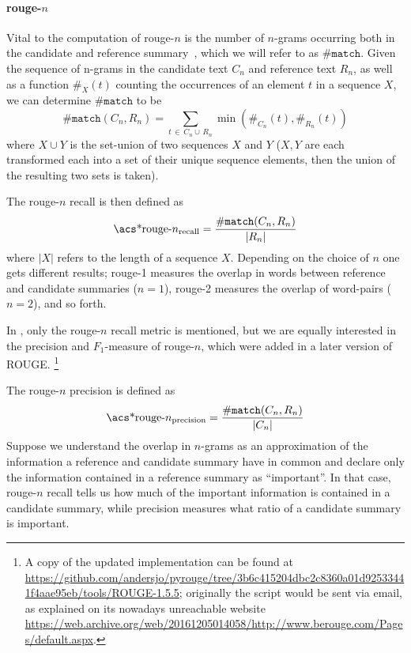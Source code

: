 \paragraph{\acs*{rouge}-\(n\)}
\newcommand{\matchcount}{\ensuremath{\#\texttt{match}}}
Vital to the computation of \acs*{rouge}-\(n\) is the number of \(n\)-grams occurring both in the candidate and reference summary~\parencite[1]{rouge},
which we will refer to as \(\matchcount\).
Given the sequence of n-grams in the candidate text \(C_n\) and reference text \(R_n\),
as well as a function \(\#_X(t)\)
counting the occurrences of an element \(t\) in a sequence \(X\),
we can determine \(\matchcount\) to be
\begin{equation}
\matchcount(C_n, R_n) = \sum_{t \,\in\, C_n \cup\, R_n} \min(\#_{C_n}\!(t), \#_{R_n}\!(t))
\end{equation}
where \(X \cup Y\) is the set-union of two sequences \(X\) and \(Y\)
(\(X, Y\) are each transformed each into a set of their unique sequence elements,
then the union of the resulting two sets is taken).

The \acs*{rouge}-\(n\) recall is then defined as
\begin{equation}
\text{\acs*{rouge}-}n_\text{recall} = \frac{\matchcount(C_n, R_n)}{|R_n|}
\end{equation}
where \(|X|\) refers to the length of a sequence \(X\).
Depending on the choice of \(n\) one gets different results;
\acs*{rouge}-1 measures the overlap in words between reference and candidate summaries (\(n = 1\)),
\acs*{rouge}-2 measures the overlap of word-pairs (\(n = 2\)), and so forth.

In \parencite{rouge}, only the \acs*{rouge}-\(n\) recall metric is mentioned,
but we are equally interested in the precision and \(F_1\)-measure of \acs*{rouge}-\(n\),
which were added in a later version of ROUGE.%
\footnote{A copy of the updated implementation can be found at \url{https://github.com/andersjo/pyrouge/tree/3b6c415204dbc2c8360a01d92533441f4aae95eb/tools/ROUGE-1.5.5};
originally the script would be sent via email, as explained on its nowadays unreachable website \url{https://web.archive.org/web/20161205014058/http://www.berouge.com/Pages/default.aspx}.}

The \acs*{rouge}-\(n\) precision is defined as
\begin{equation}
\text{\acs*{rouge}-}n_\text{precision} = \frac{\matchcount(C_n, R_n)}{|C_n|}
\end{equation}
%
Suppose we understand the overlap in \(n\)-grams as an approximation of the information a reference and candidate summary have in common
and declare only the information contained in a reference summary as \enquote{important}.
In that case, \acs*{rouge}-\(n\) recall tells us how much of the important information is contained in a candidate summary,
while precision measures what ratio of a candidate summary is important.

